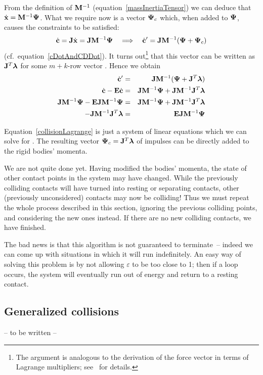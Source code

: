 From the definition of $\m{M}^{-1}$ (equation~\ref{massInertiaTensor}) we can deduce that
$\dot{\ve{x}} = \m{M}^{-1}\ve{\Psi}$. What we require now is a vector $\ve{\Psi}_c$ which, when
added to $\ve{\Psi}$, causes the constraints to be satisfied:
\begin{equation}
\dot{\ve{c}} = \m{J}\dot{\ve{x}} = \m{J}\m{M}^{-1}\ve{\Psi} \quad\Longrightarrow\quad
    \dot{\ve{c}}' = \m{J}\m{M}^{-1}(\ve{\Psi} + \ve{\Psi}_c)
\end{equation}
(cf.\ equation~\ref{cDotAndCDDot}).
It turns out\footnote{The argument is analogous to the derivation of the force vector in terms of
Lagrange multipliers; see~\cite{BaraffWitkin:97} for details.} that this vector can be written as
$\m{J}^T\ve{\lambda}$ for some $m+k$-row vector \ve{\lambda}. Hence we obtain
\begin{eqnarray}
\dot{\ve{c}}' &=& \m{J}\m{M}^{-1}(\ve{\Psi} + \m{J}^T\ve{\lambda}) \nonumber\\
\dot{\ve{c}} - \m{E}\dot{\ve{c}} &=&
    \m{J}\m{M}^{-1}\ve{\Psi} + \m{J}\m{M}^{-1}\m{J}^T\ve{\lambda} \nonumber\\
\m{J}\m{M}^{-1}\ve{\Psi} - \m{E}\m{J}\m{M}^{-1}\ve{\Psi} & = &
    \m{J}\m{M}^{-1}\ve{\Psi} + \m{J}\m{M}^{-1}\m{J}^T\ve{\lambda} \nonumber\\
-\m{J}\m{M}^{-1}\m{J}^T\ve{\lambda} &=& \m{E}\m{J}\m{M}^{-1}\ve{\Psi} \label{collisionLagrange}
\end{eqnarray}

Equation~\ref{collisionLagrange} is just a system of linear equations which we can solve for
\ve{\lambda}. The resulting vector $\ve{\Psi}_c = \m{J}^T\ve{\lambda}$ of impulses can be
directly added to the rigid bodies' momenta.

We are not quite done yet. Having modified the bodies' momenta, the state of other contact points
in the system may have changed. While the previously colliding contacts will have
turned into resting or separating contacts, other (previously unconsidered) contacts may now
be colliding! Thus we must repeat the whole process described in this section, ignoring the
previous colliding points, and considering the new ones instead. If there are no new colliding
contacts, we have finished.

The bad news is that this algorithm is not guaranteed to terminate~-- indeed we can come up with
situations in which it will run indefinitely. An easy way of solving this problem is by not
allowing $\varepsilon$ to be too close to 1; then if a loop occurs, the system will eventually
run out of energy and return to a resting contact.


\subsection{Generalized collisions\label{generalizedCollisions}}

-- to be written --
